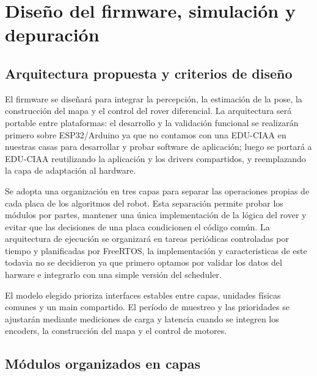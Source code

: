 \documentclass[11pt,a4paper]{article}
\begin{document}
\section{Diseño del firmware, simulación y depuración}
\label{sec:diseno-firmware}

\subsection{Arquitectura propuesta y criterios de diseño}

El firmware se diseñará para integrar la percepción, la estimación de la pose,
la construcción del mapa y el control del rover diferencial. La arquitectura
será portable entre plataformas: el desarrollo y la validación funcional se
realizarán primero sobre ESP32/Arduino ya que no contamos con una EDU-CIAA en nuestras casas para desarrollar y probar software de aplicación; luego se portará a EDU-CIAA reutilizando la
aplicación y los drivers compartidos, y reemplazando la capa de adaptación al
hardware.

Se adopta una organización en tres capas para separar las operaciones propias
de cada placa de los algoritmos del robot. Esta separación permite probar los
módulos por partes, mantener una única implementación de la lógica del rover y
evitar que las decisiones de una placa condicionen el código común. La
arquitectura de ejecución se organizará en tareas periódicas controladas por
tiempo y planificadas por FreeRTOS, la implementación y caracteristicas de este todavia no se decidieron ya que primero optamos por validar los datos del harware e integrarlo con una simple versión del scheduler.

El modelo elegido prioriza interfaces estables entre capas, unidades físicas
comunes y un main compartido. El período de muestreo y las prioridades se
ajustarán mediante mediciones de carga y latencia cuando se integren los
encoders, la construcción del mapa y el control de motores.


\subsection{Módulos organizados en capas}
\end{document}

